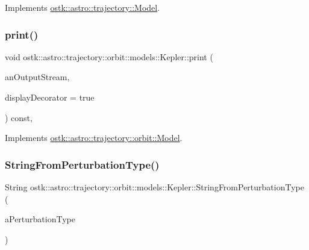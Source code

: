 Implements \hyperlink{classostk_1_1astro_1_1trajectory_1_1_model_a874f79846e845859c070ce1b9874fc9c}{ostk\+::astro\+::trajectory\+::\+Model}.

\mbox{\label{classostk_1_1astro_1_1trajectory_1_1orbit_1_1models_1_1_kepler_a9c71803234f356ade03453e3ae19ae94}} 
\subsubsection{\texorpdfstring{print()}{print()}}
{\footnotesize\ttfamily void ostk\+::astro\+::trajectory\+::orbit\+::models\+::\+Kepler\+::print (\begin{DoxyParamCaption}\item[{std\+::ostream \&}]{an\+Output\+Stream,  }\item[{bool}]{display\+Decorator = {\ttfamily true} }\end{DoxyParamCaption}) const\hspace{0.3cm}{\ttfamily [override]}, {\ttfamily [virtual]}}



Implements \hyperlink{classostk_1_1astro_1_1trajectory_1_1orbit_1_1_model_a8ea45c1a6e51a6153ce3f72f5294f0c6}{ostk\+::astro\+::trajectory\+::orbit\+::\+Model}.

\mbox{\label{classostk_1_1astro_1_1trajectory_1_1orbit_1_1models_1_1_kepler_ad780ed9b53e355ebef1597f86d30cf84}} 
\subsubsection{\texorpdfstring{String\+From\+Perturbation\+Type()}{StringFromPerturbationType()}}
{\footnotesize\ttfamily String ostk\+::astro\+::trajectory\+::orbit\+::models\+::\+Kepler\+::\+String\+From\+Perturbation\+Type (\begin{DoxyParamCaption}\item[{const \hyperlink{classostk_1_1astro_1_1trajectory_1_1orbit_1_1models_1_1_kepler_a3750f9177ff06a1938826e2c2881d5a9}{Kepler\+::\+Perturbation\+Type} \&}]{a\+Perturbation\+Type }\end{DoxyParamCaption})\hspace{0.3cm}{\ttfamily [static]}}



